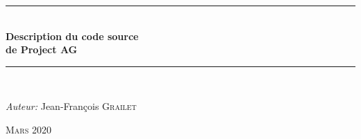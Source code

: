 \documentclass[a4paper,titlepage,11pt]{report}
\newcommand{\HRule}{\rule{\linewidth}{0.5mm}} %
\begin{document}
\begin{titlepage}

\center %
 

\HRule \\[0.4cm]
{ \huge \bfseries Description du code source\\
de Project AG
}\\[0.4cm]
\HRule \\[5cm]
 

\begin{minipage}{0.4\textwidth}
\begin{flushleft} \large
\emph{Auteur:}
Jean-François \textsc{Grailet}
\end{flushleft}
\end{minipage}


\textsc{\large Mars 2020}\\[0.5cm]



\vfill %

\end{titlepage}


\newpage
\setcounter{page}{1}
\tableofcontents 
\newpage
\setcounter{page}{1}








\end{document}
